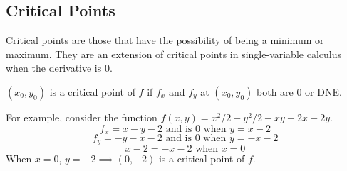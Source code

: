\subsection{Critical Points}
\noindent
Critical points are those that have the possibility of being a minimum or maximum. They are an extension of critical points in single-variable calculus when the derivative is 0.\\

\noindent
\begin{definition}
	$(x_0, y_0)$ is a critical point of $f$ if $f_x$ and $f_y$ at $(x_0, y_0)$ both are 0 or DNE.
\end{definition}

\noindent
For example, consider the function $f(x,y) = x^2/2 - y^2/2 - xy - 2x - 2y$.
\begin{equation*}
	f_x = x - y - 2	\text{ and is } 0 \text{ when } y = x-2
\end{equation*}
\begin{equation*}
	f_y = -y - x - 2 \text{ and is } 0 \text{ when } y = -x-2
\end{equation*}
\begin{equation*}
	x - 2 = -x -2 \text{ when } x = 0
\end{equation*}
When $x = 0$, $ y =-2 \implies (0, -2)$ is a critical point of $f$.

